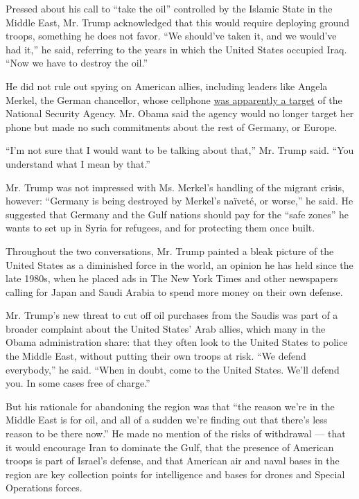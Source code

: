 Pressed about his call to ``take the oil'' controlled by the Islamic
State in the Middle East, Mr. Trump acknowledged that this would require
deploying ground troops, something he does not favor. ``We should've
taken it, and we would've had it,'' he said, referring to the years in
which the United States occupied Iraq. ``Now we have to destroy the
oil.''

He did not rule out spying on American allies, including leaders like
Angela Merkel, the German chancellor, whose cellphone
\href{http://www.nytimes3xbfgragh.onion/2013/10/25/world/europe/allegation-of-us-spying-on-merkel-puts-obama-at-crossroads.html}{was
apparently a target} of the National Security Agency. Mr. Obama said the
agency would no longer target her phone but made no such commitments
about the rest of Germany, or Europe.

``I'm not sure that I would want to be talking about that,'' Mr. Trump
said. ``You understand what I mean by that.''

Mr. Trump was not impressed with Ms. Merkel's handling of the migrant
crisis, however: ``Germany is being destroyed by Merkel's naïveté, or
worse,'' he said. He suggested that Germany and the Gulf nations should
pay for the ``safe zones'' he wants to set up in Syria for refugees, and
for protecting them once built.

Throughout the two conversations, Mr. Trump painted a bleak picture of
the United States as a diminished force in the world, an opinion he has
held since the late 1980s, when he placed ads in The New York Times and
other newspapers calling for Japan and Saudi Arabia to spend more money
on their own defense.

Mr. Trump's new threat to cut off oil purchases from the Saudis was part
of a broader complaint about the United States' Arab allies, which many
in the Obama administration share: that they often look to the United
States to police the Middle East, without putting their own troops at
risk. ``We defend everybody,'' he said. ``When in doubt, come to the
United States. We'll defend you. In some cases free of charge.''

But his rationale for abandoning the region was that ``the reason we're
in the Middle East is for oil, and all of a sudden we're finding out
that there's less reason to be there now.'' He made no mention of the
risks of withdrawal --- that it would encourage Iran to dominate the
Gulf, that the presence of American troops is part of Israel's defense,
and that American air and naval bases in the region are key collection
points for intelligence and bases for drones and Special Operations
forces.


